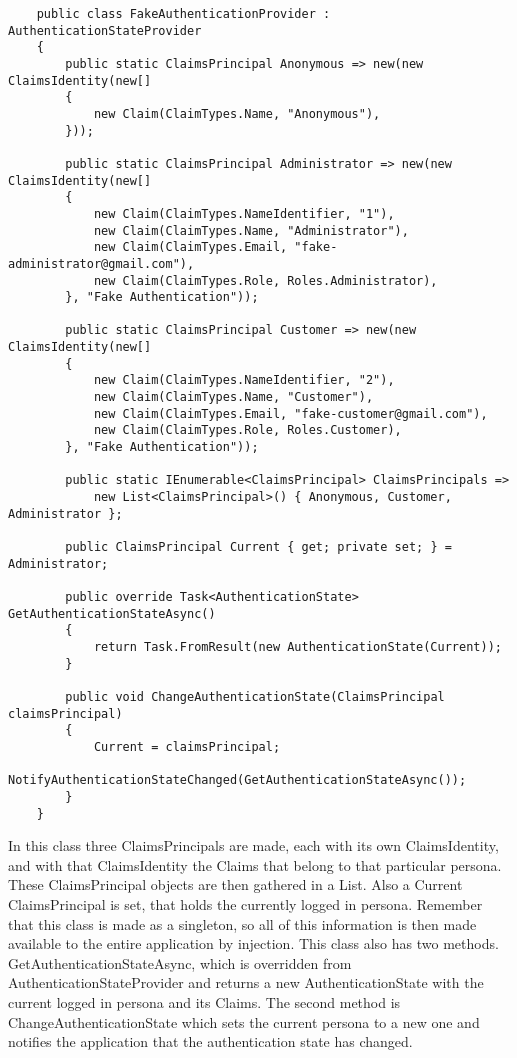 \begin{verbatim}
    public class FakeAuthenticationProvider : AuthenticationStateProvider
    {
        public static ClaimsPrincipal Anonymous => new(new ClaimsIdentity(new[]
        {
            new Claim(ClaimTypes.Name, "Anonymous"),
        }));
        
        public static ClaimsPrincipal Administrator => new(new ClaimsIdentity(new[]
        {
            new Claim(ClaimTypes.NameIdentifier, "1"),
            new Claim(ClaimTypes.Name, "Administrator"),
            new Claim(ClaimTypes.Email, "fake-administrator@gmail.com"),
            new Claim(ClaimTypes.Role, Roles.Administrator),
        }, "Fake Authentication"));
        
        public static ClaimsPrincipal Customer => new(new ClaimsIdentity(new[]
        {
            new Claim(ClaimTypes.NameIdentifier, "2"),
            new Claim(ClaimTypes.Name, "Customer"),
            new Claim(ClaimTypes.Email, "fake-customer@gmail.com"),
            new Claim(ClaimTypes.Role, Roles.Customer),
        }, "Fake Authentication"));
        
        public static IEnumerable<ClaimsPrincipal> ClaimsPrincipals =>
            new List<ClaimsPrincipal>() { Anonymous, Customer, Administrator }; 
        
        public ClaimsPrincipal Current { get; private set; } = Administrator;
        
        public override Task<AuthenticationState> GetAuthenticationStateAsync()
        {
            return Task.FromResult(new AuthenticationState(Current));
        }
        
        public void ChangeAuthenticationState(ClaimsPrincipal claimsPrincipal)
        {
            Current = claimsPrincipal;
            NotifyAuthenticationStateChanged(GetAuthenticationStateAsync());
        }
    }
\end{verbatim}

In this class three ClaimsPrincipals are made, each with its own ClaimsIdentity, and with that ClaimsIdentity the Claims that belong to that particular persona. These ClaimsPrincipal objects are then gathered in a List. Also a Current ClaimsPrincipal is set, that holds the currently logged in persona. Remember that this class is made as a singleton, so all of this information is then made available to the entire application by injection. This class also has two methods. GetAuthenticationStateAsync, which is overridden from AuthenticationStateProvider and returns a new AuthenticationState with the current logged in persona and its Claims. The second method is ChangeAuthenticationState which sets the current persona to a new one and notifies the application that the authentication state has changed.

